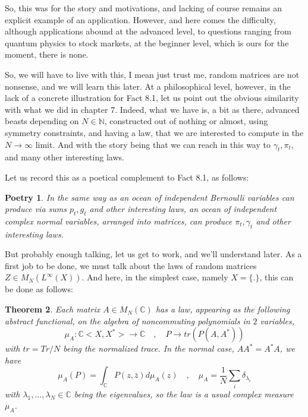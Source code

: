 \documentclass[12pt]{amsbook}
\newtheorem{theorem}{Theorem}[chapter]
\newtheorem{poetry}[theorem]{Poetry}
\begin{document}
So, this was for the story and motivations, and lacking of course remains an explicit example of an application. However, and here comes the difficulty, although applications abound at the advanced level, to questions ranging from quantum physics to stock markets, at the beginner level, which is ours for the moment, there is none.

\bigskip

So, we will have to live with this, I mean just trust me, random matrices are not nonsense, and we will learn this later. At a philosophical level, however, in the lack of a concrete illustration for Fact 8.1, let us point out the obvious similarity with what we did in chapter 7. Indeed, what we have is, a bit as there, advanced beasts depending on $N\in\mathbb N$, constructed out of nothing or almost, using symmetry constraints, and having a law, that we are interested to compute in the $N\to\infty$ limit. And with the story being that we can reach in this way to $\gamma_t,\pi_t$, and many other interesting laws.

\bigskip

Let us record this as a poetical complement to Fact 8.1, as follows:

\begin{poetry}
In the same way as an ocean of independent Bernoulli variables can produce via sums $p_t,g_t$ and other interesting laws, an ocean of independent complex normal variables, arranged into matrices, can produce $\pi_t,\gamma_t$ and other interesting laws.
\end{poetry}

But probably enough talking, let us get to work, and we'll understand later. As a first job to be done, we must talk about the laws of random matrices $Z\in M_N(L^\infty(X))$. And here, in the simplest case, namely $X=\{.\}$, this can be done as follows:


\begin{theorem}
Each matrix $A\in M_N(\mathbb C)$ has a law, appearing as the following abstract functional, on the algebra of noncommuting polynomials in $2$ variables,
$$\mu_A:\mathbb C<X,X^*>\to\mathbb C\quad,\quad P\to tr(P(A,A^*))$$
with $tr=Tr/N$ being the normalized trace. In the normal case, $AA^*=A^*A$, we have
$$\mu_A(P)=\int_\mathbb CP(z,\bar{z})d\mu_A(z)\quad,\quad\mu_A=\frac{1}{N}\sum_i\delta_{\lambda_i}$$
with $\lambda_1,\ldots,\lambda_N\in\mathbb C$ being the eigenvalues, so the law is a usual complex measure $\mu_A$.
\end{theorem}
\end{document}
